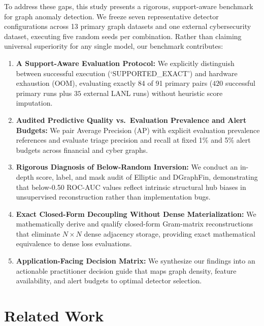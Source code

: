 \documentclass[11pt,a4paper]{article}
\begin{document}
To address these gaps, this study presents a rigorous, support-aware benchmark for graph anomaly detection. We freeze seven representative detector configurations across 13 primary graph datasets and one external cybersecurity dataset, executing five random seeds per combination. Rather than claiming universal superiority for any single model, our benchmark contributes:
\begin{enumerate}
    \item \textbf{A Support-Aware Evaluation Protocol:} We explicitly distinguish between successful execution (`SUPPORTED\_EXACT') and hardware exhaustion (OOM), evaluating exactly 84 of 91 primary pairs ($420$ successful primary runs plus $35$ external LANL runs) without heuristic score imputation.
    \item \textbf{Audited Predictive Quality vs.\ Evaluation Prevalence and Alert Budgets:} We pair Average Precision (AP) with explicit evaluation prevalence references and evaluate triage precision and recall at fixed 1\% and 5\% alert budgets across financial and cyber graphs.
    \item \textbf{Rigorous Diagnosis of Below-Random Inversion:} We conduct an in-depth score, label, and mask audit of Elliptic and DGraphFin, demonstrating that below-0.50 ROC-AUC values reflect intrinsic structural hub biases in unsupervised reconstruction rather than implementation bugs.
    \item \textbf{Exact Closed-Form Decoupling Without Dense Materialization:} We mathematically derive and qualify closed-form Gram-matrix reconstructions that eliminate $N \times N$ dense adjacency storage, providing exact mathematical equivalence to dense loss evaluations.
    \item \textbf{Application-Facing Decision Matrix:} We synthesize our findings into an actionable practitioner decision guide that maps graph density, feature availability, and alert budgets to optimal detector selection.
\end{enumerate}

\section{Related Work}
\label{sec:related}
\end{document}
